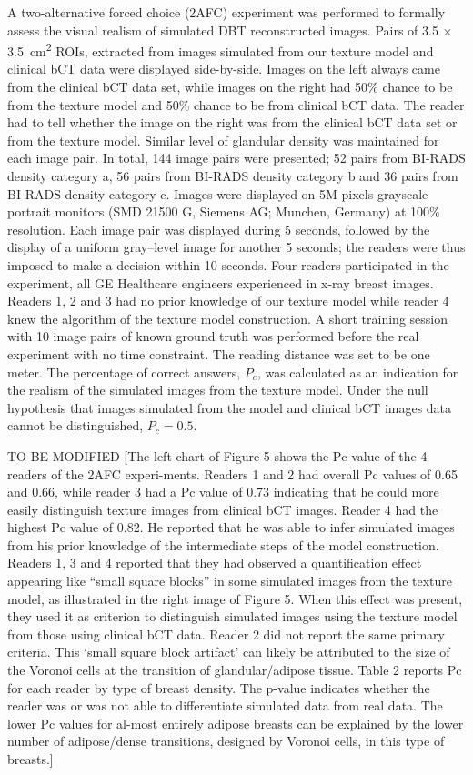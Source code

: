 \documentclass[journal]{IEEEtran}
\begin{document}
A two-alternative forced choice (2AFC) experiment was performed to
formally assess the visual realism of simulated DBT reconstructed
images. Pairs of 3.5 $\times$ \SI{3.5}{\cm\squared} ROIs, extracted
from images simulated from our texture model and clinical bCT data
were displayed side-by-side. Images on the left always came from the
clinical bCT data set, while images on the right had 50\% chance to be
from the texture model and 50\% chance to be from clinical bCT
data. The reader had to tell whether the image on the right was from
the clinical bCT data set or from the texture model. Similar level of
glandular density was maintained for each image pair. In total, 144
image pairs were presented; 52 pairs from BI-RADS density category a,
56 pairs from BI-RADS density category b and 36 pairs from BI-RADS
density category c. Images were displayed on 5M pixels grayscale
portrait monitors (SMD 21500 G, Siemens AG; Munchen, Germany) at 100\%
resolution. Each image pair was displayed during 5 seconds, followed
by the display of a uniform gray–level image for another 5 seconds;
the readers were thus imposed to make a decision within 10
seconds. Four readers participated in the experiment, all GE
Healthcare engineers experienced in x-ray breast images. Readers 1, 2
and 3 had no prior knowledge of our texture model while reader 4 knew
the algorithm of the texture model construction. A short training
session with 10 image pairs of known ground truth was performed before
the real experiment with no time constraint. The reading distance was
set to be one meter. The percentage of correct answers, $P_c$, was
calculated as an indication for the realism of the simulated images
from the texture model. Under the null hypothesis that images
simulated from the model and clinical bCT images data cannot be
distinguished, $P_c = 0.5$.

TO BE MODIFIED [The left chart of Figure 5 shows the Pc value of the 4
readers of the 2AFC experi-ments. Readers 1 and 2 had overall Pc
values of 0.65 and 0.66, while reader 3 had a Pc value of 0.73
indicating that he could more easily distinguish texture images from
clinical bCT images. Reader 4 had the highest Pc value of 0.82. He
reported that he was able to infer simulated images from his prior
knowledge of the intermediate steps of the model construction. Readers
1, 3 and 4 reported that they had observed a quantification effect
appearing like “small square blocks” in some simulated images from the
texture model, as illustrated in the right image of Figure 5. When
this effect was present, they used it as criterion to distinguish
simulated images using the texture model from those using clinical bCT
data. Reader 2 did not report the same primary criteria. This ‘small
square block artifact’ can likely be attributed to the size of the
Voronoi cells at the transition of glandular/adipose tissue. Table 2
reports Pc for each reader by type of breast density. The p-value
indicates whether the reader was or was not able to differentiate
simulated data from real data. The lower Pc values for al-most
entirely adipose breasts can be explained by the lower number of
adipose/dense transitions, designed by Voronoi cells, in this type of
breasts.]
\end{document}
